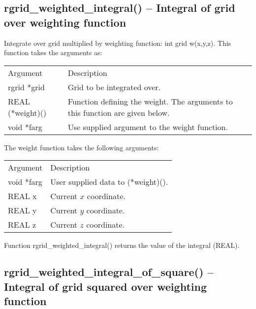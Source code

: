 \documentclass[12pt,letterpaper]{report}
\begin{document}
\subsection{rgrid\_weighted\_integral() -- Integral of grid over weighting function}

Integrate over grid multiplied by weighting function: int grid w(x,y,z). This function takes the arguments as:
\begin{longtable}{p{} p{}}
Argument & Description\\
\cline{1-2}
rgrid *grid & Grid to be integrated over.\\
REAL (*weight)() & Function defining the weight. The arguments to this function are given below.\\
void *farg & Use supplied argument to the weight function.\\
\end{longtable}
\noindent
The weight function takes the following arguments:
\begin{longtable}{p{} p{}}
Argument & Description\\
\cline{1-2}
void *farg & User supplied data to (*weight)().\\
REAL x & Current $x$ coordinate.\\
REAL y & Current $y$ coordinate.\\
REAL z & Current $z$ coordinate.\\
\end{longtable}
\noindent
Function rgrid\_weighted\_integral() returns the value of the integral (REAL).

\subsection{rgrid\_weighted\_integral\_of\_square() -- Integral of grid squared over weighting function}
\end{document}
